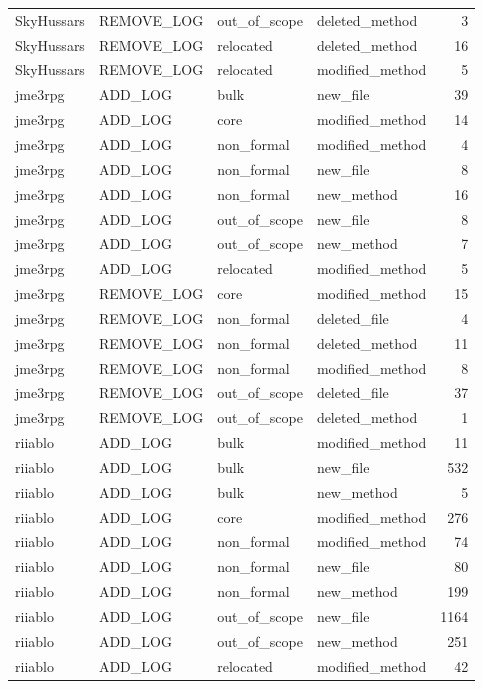 {\begin{longtable}{llllr}
SkyHussars & REMOVE\_LOG & out\_of\_scope & deleted\_method & 3 \\
SkyHussars & REMOVE\_LOG & relocated & deleted\_method & 16 \\
SkyHussars & REMOVE\_LOG & relocated & modified\_method & 5 \\
jme3rpg & ADD\_LOG & bulk & new\_file & 39 \\
jme3rpg & ADD\_LOG & core & modified\_method & 14 \\
jme3rpg & ADD\_LOG & non\_formal & modified\_method & 4 \\
jme3rpg & ADD\_LOG & non\_formal & new\_file & 8 \\
jme3rpg & ADD\_LOG & non\_formal & new\_method & 16 \\
jme3rpg & ADD\_LOG & out\_of\_scope & new\_file & 8 \\
jme3rpg & ADD\_LOG & out\_of\_scope & new\_method & 7 \\
jme3rpg & ADD\_LOG & relocated & modified\_method & 5 \\
jme3rpg & REMOVE\_LOG & core & modified\_method & 15 \\
jme3rpg & REMOVE\_LOG & non\_formal & deleted\_file & 4 \\
jme3rpg & REMOVE\_LOG & non\_formal & deleted\_method & 11 \\
jme3rpg & REMOVE\_LOG & non\_formal & modified\_method & 8 \\
jme3rpg & REMOVE\_LOG & out\_of\_scope & deleted\_file & 37 \\
jme3rpg & REMOVE\_LOG & out\_of\_scope & deleted\_method & 1 \\
riiablo & ADD\_LOG & bulk & modified\_method & 11 \\
riiablo & ADD\_LOG & bulk & new\_file & 532 \\
riiablo & ADD\_LOG & bulk & new\_method & 5 \\
riiablo & ADD\_LOG & core & modified\_method & 276 \\
riiablo & ADD\_LOG & non\_formal & modified\_method & 74 \\
riiablo & ADD\_LOG & non\_formal & new\_file & 80 \\
riiablo & ADD\_LOG & non\_formal & new\_method & 199 \\
riiablo & ADD\_LOG & out\_of\_scope & new\_file & 1164 \\
riiablo & ADD\_LOG & out\_of\_scope & new\_method & 251 \\
riiablo & ADD\_LOG & relocated & modified\_method & 42 \\

\end{longtable}}
